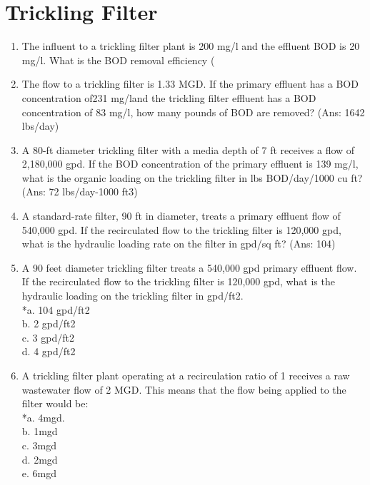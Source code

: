 \section*{Trickling Filter} 
\begin{enumerate}
\item The influent to a trickling filter plant is 200 mg/l and the effluent BOD is 20 mg/l.  What is the BOD removal efficiency (%
 \item The flow to a trickling filter is 1.33 MGD. If the primary effluent has a BOD concentration of231 mg/land the trickling filter effluent has a BOD concentration of 83 mg/l, how many pounds of BOD are removed? (Ans: 1642 lbs/day)\\
 \item  A 80-ft diameter trickling filter with a media depth of 7 ft receives a flow of 2,180,000 gpd. If the BOD concentration of the primary effluent is 139 mg/l, what is the organic loading on the trickling filter in lbs BOD/day/1000 cu ft? (Ans: 72 lbs/day-1000 ft3)\\
 \item  A standard-rate filter, 90 ft in diameter, treats a primary effluent flow of 540,000 gpd. If the recirculated flow to the trickling filter is 120,000 gpd, what is the hydraulic loading rate on the filter in gpd/sq ft? (Ans: 104)\\
\item  A 90 feet diameter trickling filter treats a 540,000 gpd primary effluent flow.  If the recirculated flow to the trickling filter is 120,000 gpd, what is the hydraulic loading on the trickling filter in gpd/ft2.\\

 *a. 104 gpd/ft2 \\
 b. 2 gpd/ft2 \\
 c. 3 gpd/ft2 \\
 d. 4 gpd/ft2 \\


\item  A trickling filter plant operating at a recirculation ratio of 1 receives a raw wastewater flow of 2 MGD.  This means that the flow being applied to the filter would be: \\

 *a. 4mgd. \\
 b. 1mgd \\
 c. 3mgd \\
 d. 2mgd \\
 e. 6mgd \\



\end{enumerate}

